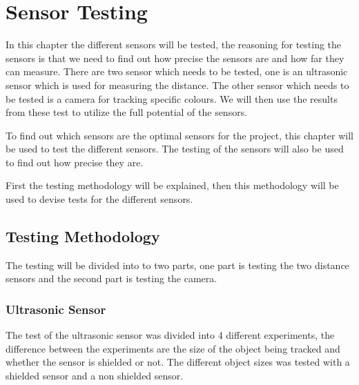 \section{Sensor Testing} 
In this chapter the different sensors will be tested, the reasoning for testing
the sensors is that we need to find out how precise the sensors are and how far
they can measure. There are two sensor which needs to be tested, one is an
ultrasonic sensor which is used for measuring the distance. The other sensor
which needs to be tested is a camera for tracking specific colours. We will then
use the results from these test to utilize the full potential of the sensors. 
 
To find out which sensors are the optimal
sensors for the project, this chapter will be used to test the different sensors. The testing of the
sensors will also be used to find out how precise they are.\nl

First the testing methodology will be explained, then this methodology
will be used to devise tests for the different sensors. 

\subsection{Testing Methodology}
The testing will be divided into to two parts, one part is testing the two
distance sensors and the second part is testing the camera. 

\subsubsection{Ultrasonic Sensor}
The test of the ultrasonic sensor was divided into 4 different experiments, the
difference between the experiments are the size of the object being tracked and
whether the sensor is shielded or not. The different object sizes was tested
with a shielded sensor and a non shielded sensor. \nl




